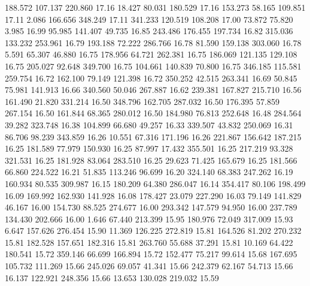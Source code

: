  188.572  107.137  220.860        17.16
  18.427   80.031  180.529        17.16
 153.273   58.165  109.851        17.11
   2.086  166.656  348.249        17.11
 341.233  120.519  108.208        17.00
  73.872   75.820    3.985        16.99
  95.985  141.407   49.735        16.85
 243.486  176.455  197.734        16.82
 315.036  133.232  253.961        16.79
 193.188   72.222  286.766        16.78
  81.590  159.138  303.060        16.78
   5.591   65.307   46.880        16.75
 178.956   64.721  262.381        16.75
 186.069  121.135  129.108        16.75
 205.027   92.648  349.700        16.75
 104.661  140.839   70.800        16.75
 346.185  115.581  259.754        16.72
 162.100   79.149  121.398        16.72
 350.252   42.515  263.341        16.69
  50.845   75.981  141.913        16.66
 340.560   50.046  267.887        16.62
 239.381  167.827  215.710        16.56
 161.490   21.820  331.214        16.50
 348.796  162.705  287.032        16.50
 176.395   57.859  267.154        16.50
 161.844   68.365  280.012        16.50
 184.980   76.813  252.648        16.48
 284.564   39.282  323.748        16.38
 104.899   66.680   49.257        16.33
 339.507   43.832  250.069        16.31
  86.706   98.239  343.859        16.26
  10.551   67.316  171.196        16.26
 221.867  156.642  187.215        16.25
 181.589   77.979  150.930        16.25
  87.997   17.432  355.501        16.25
 217.219   93.328  321.531        16.25
 181.928   83.064  283.510        16.25
  29.623   71.425  165.679        16.25
 181.566   66.860  224.522        16.21
  51.835  113.246   96.699        16.20
 324.140   68.383  247.262        16.19
 160.934   80.535  309.987        16.15
 180.209   64.380  286.047        16.14
 354.417   80.106  198.499        16.09
 169.992  162.930  141.928        16.08
 178.427   23.079  227.290        16.03
  79.149  141.829   46.167        16.00
 154.730   88.525  274.677        16.00
 293.342  147.579   94.950        16.00
 237.789  134.430  202.666        16.00
   1.646   67.440  213.399        15.95
 180.976   72.049  317.009        15.93
   6.647  157.626  276.454        15.90
  11.369  126.225  272.819        15.81
 164.526   81.202  270.232        15.81
 182.528  157.651  182.316        15.81
 263.760   55.688   37.291        15.81
  10.169   64.422  180.541        15.72
 359.146   66.699  166.894        15.72
 152.477   75.217   99.614        15.68
 167.695  105.732  111.269        15.66
 245.026   69.057   41.341        15.66
 242.379   62.167   54.713        15.66
  16.137  122.921  248.356        15.66
  13.653  130.028  219.032        15.59
